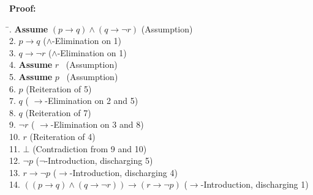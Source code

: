 \documentclass[12pt]{article}
\begin{document}
\textbf{Proof:}
\begin{tabbing}
\hspace*{2cm}\= . \quad \textbf{Assume } \((p\to q)\land (q\to \lnot r)\) \quad (Assumption)\\[0.5em]
2. \quad \(p\to q\) \quad \quad (\(\land\)-Elimination on 1)\\[0.5em]
3. \quad \(q\to \lnot r\) \quad \quad (\(\land\)-Elimination on 1)\\[0.5em]
4. \quad \textbf{Assume } \(r\) \quad \quad \ (Assumption)\\[0.5em]
5. \quad \textbf{Assume } \(p\) \quad \quad \ (Assumption)\\[0.5em]
6. \quad \(p\) \quad \quad (Reiteration of 5)\\[0.5em]
7. \quad \(q\) \quad \quad ( \(\to\)-Elimination on 2 and 5)\\[0.5em]
8. \quad \(q\) \quad \quad (Reiteration of 7)\\[0.5em]
9. \quad \(\lnot r\) \quad \quad ( \(\to\)-Elimination on 3 and 8)\\[0.5em]
10. \quad \(r\) \quad \quad (Reiteration of 4)\\[0.5em]
11. \quad \(\bot\) \quad \quad (Contradiction from 9 and 10)\\[0.5em]
12. \quad \(\lnot p\) \quad \quad (\(\lnot\)-Introduction, discharging 5)\\[0.5em]
13. \quad \(r\to \lnot p\) \quad \quad (\(\to\)-Introduction, discharging 4)\\[0.5em]
14. \quad \(((p\to q)\land (q\to \lnot r))\to (r\to \lnot p)\) \quad (\(\to\)-Introduction, discharging 1)
\end{tabbing}

\end{document}

